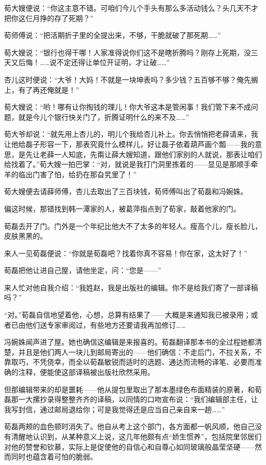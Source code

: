 \par 荀大嫂便说：“你这主意不错。可咱们今儿个手头有那么多活动钱么？头几天不才把你这仨月挣的存了死期？”
\par 荀师傅说：“把活期折子里的全提出来，不够，干脆就破了那死期……”
\par 荀大嫂说：“银行也得干哪！人家准得说你们这不是瞎折腾吗？刚存上死期，没三天又后悔！……说不定还得让单位开证明，才让破……”
\par 杏儿这时便说：“大爷！大妈！不就是一块坤表吗？多少钱？五百够不够？俺先搁上，有了再还俺就是！”
\par 荀大嫂说：“哟！哪有让你掏钱的理儿！你大爷这本是管闲事！我们管下来不成问题，就是今儿个银行快关门了，折腾证明什么的来不及……”
\par 荀大爷却说：“就先用上杏儿的，明儿个我给杏儿补上。你去悄悄把老薛请来，我让他给磊子形容一下，那表究竟什么模样儿，好让磊子依着葫芦画个瓢——我的意思，是先让老薛一人知底，先甭让薛大嫂知道，跟他们家别的人就说，那表让咱们给找着了。”荀大嫂一拍巴掌：“对，就说是我打门洞里拣着的——显见是那顺手牵羊的临出门害了怕，给扔在那旮旯里了！”
\par 荀大嫂便去请薛师傅，杏儿去取出了三百块钱，荀师傅叫出了荀磊和冯婉姝。
\par 偏这时候，那错找到韩一潭家的人，被葛萍指点到了荀家，敲着他家的门。
\par 荀磊去开了门。门外是一个年纪比他大不了太多的年轻人。瘦高个儿，瘦长脸儿，皮肤黑黑的。
\par 来人一见荀磊便说：“你就是荀磊吧？找着你真不容易！你在家，这太好了！”
\par 荀磊把他让进自己屋，请他坐定，问：“您是——”
\par 来人忙对他自我介绍：“我姓赵，我是出版社的编辑。你不是给我们寄了一部译稿吗？”
\par “对。”荀磊自信地望着他，心想，总算有结果了——大概是来通知我已被录用；或者已由他们送专家审阅过，有些地方还要请我再加修订……
\par 冯婉姝闻声进了屋。她也确信这编辑是来报喜的。荀磊翻译那本书的全过程她都清楚，并且是他们两人一块儿到邮局寄出的——他们确信：不走后门，不拉关系，不靠取巧，不凭侥幸，而全以荀磊敏锐而适时的选题、通达而流畅的译笔、必要而准确的注释，便能使这部译稿被出版社欣然采用。
\par 但那编辑带来的却是噩耗——他从提包里取出了那本墨绿色布面精装的原著，和荀磊那一大摞抄录得整整齐齐的译稿，以同情的口吻宣布说：“我们编辑部主任，让我写封信，通过邮局退给你；可是我觉得还是应当自己亲自来一趟……”
\par 荀磊两颊的血色顿时消失了。他自从考上这个部门，各方面都一帆风顺，他自己没有清醒地认识到，从某种意义上说，这几年他颇有点“娇生惯养”，包括院里邻居们对他的赞誉和钦慕，实际上是促使他的自信心和自尊心如同玻璃般晶莹坚硬——然而同时也蕴含着可怕的脆弱。

